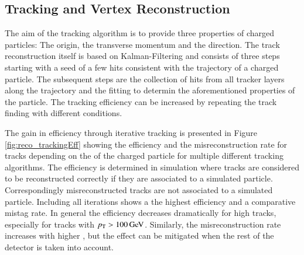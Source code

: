 \subsection{Tracking and Vertex Reconstruction}

The aim of the tracking algorithm is to provide three properties of charged particles: The origin, the transverse momentum and the direction.
The track reconstruction itself is based on Kalman-Filtering \cite{Adam:934067} and consists of three steps starting with a seed of a few hits consistent with the trajectory of a charged particle.
The subsequent steps are the collection of hits from all tracker layers along the trajectory and the fitting to determin the aforementioned properties of the particle.
The tracking efficiency can be increased by repeating the track finding with different conditions.

The gain in efficiency through iterative tracking is presented in Figure \ref{fig:reco_trackingEff} showing the efficiency and the misreconstruction rate for tracks depending on the \pt of the charged particle for 
multiple different tracking algorithms. The efficiency is determined in simulation where tracks are considered to be reconstructed correctly if they are associated to a simulated particle. Correspondingly 
misreconstructed tracks are not associated to a simulated particle. 
Including all iterations shows a the highest efficiency and a comparative mistag rate. In general the efficiency decreases dramatically for high \pt tracks, especially for tracks with $p_{\mathrm{T}} > 100 \,\text{Ge\hspace{-.08em}V}$.
Similarly, the misreconstruction rate increases with higher \pt, but the effect can be mitigated when the rest of the detector is taken into account.


